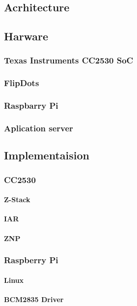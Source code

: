 \documentclass[a4paper,12pt,english]{article}
\begin{document}
\subsection{Acrhitecture}

\subsection{Harware}
\subsubsection{Texas Instruments CC2530 SoC}
\subsubsection{FlipDots}
\subsubsection{Raspbarry Pi}
\subsubsection{Aplication server}

\subsection{Implementaision}
\subsubsection{CC2530}
	\paragraph{Z-Stack}
	\paragraph{IAR}
	\paragraph{ZNP}

\subsubsection{Raspberry Pi}
\paragraph{Linux}
\paragraph{BCM2835 Driver}
\end{document}
